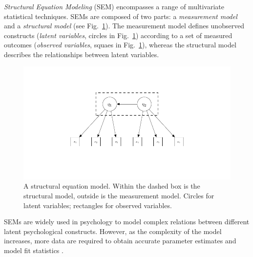 \documentclass[graybox]{svmult}
\begin{document}
\emph{Structural Equation Modeling} (SEM) encompasses  a range of multivariate statistical techniques. SEMs are composed of two parts: a \emph{measurement model} and a \emph{structural model} (see Fig.~\ref{fig:example_sem}).   The measurement model defines unobserved constructs (\emph{latent variables}, circles in Fig.~\ref{fig:example_sem}) according to a set of measured outcomes (\emph{observed variables}, squaes in Fig.~\ref{fig:example_sem}), whereas the structural model describes the relationships between latent variables.
\begin{figure}[b]
	\sidecaption
	\label{fig:example_sem}
	\includegraphics[width = .45\textwidth]{figure/Plot_SEM}
	\caption{A structural equation model. Within the dashed box is the structural model, outside is the measurement model. Circles for latent variables; rectangles for observed variables.}
\end{figure}
SEMs are widely used in psychology to model complex relations between different latent psychological constructs. However, as the complexity of the model increases, more data are required to obtain accurate parameter estimates and model fit statistics \cite{wolfSampleSizeRequirements2013}.
\end{document}
